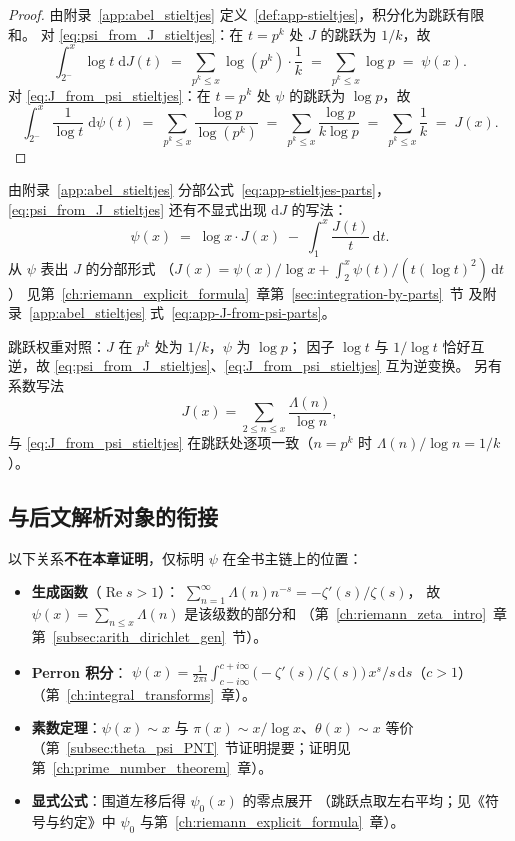 \begin{proof}
由附录~\ref{app:abel_stieltjes} 定义~\ref{def:app-stieltjes}，积分化为跳跃有限和。
对 \eqref{eq:psi_from_J_stieltjes}：在 $t=p^k$ 处 $J$ 的跳跃为 $1/k$，故
\[
\int_{2^-}^{x} \log t \; \mathrm{d}J(t)
  \;=\; \sum_{p^k \le x} \log(p^k) \cdot \frac{1}{k}
  \;=\; \sum_{p^k \le x} \log p
  \;=\; \psi(x).
\]
对 \eqref{eq:J_from_psi_stieltjes}：在 $t=p^k$ 处 $\psi$ 的跳跃为 $\log p$，故
\[
\int_{2^-}^{x} \frac{1}{\log t} \; \mathrm{d}\psi(t)
  \;=\; \sum_{p^k \le x} \frac{\log p}{\log(p^k)}
  \;=\; \sum_{p^k \le x} \frac{\log p}{k\log p}
  \;=\; \sum_{p^k \le x} \frac{1}{k}
  \;=\; J(x).
\]
\end{proof}

由附录~\ref{app:abel_stieltjes} 分部公式~\eqref{eq:app-stieltjes-parts}，
\eqref{eq:psi_from_J_stieltjes} 还有不显式出现 $\mathrm{d}J$ 的写法：
\begin{equation}
\psi(x) \;=\; \log x \cdot J(x) \;-\; \int_1^x \frac{J(t)}{t} \, \mathrm{d}t.
\label{eq:psi_J_parts}
\end{equation}
从 $\psi$ 表出 $J$ 的分部形式
（$J(x)=\psi(x)/\log x+\int_2^x\psi(t)/(t(\log t)^2)\,\mathrm{d}t$）
见第~\ref{ch:riemann_explicit_formula}~章第~\ref{sec:integration-by-parts}~节
及附录~\ref{app:abel_stieltjes} 式~\eqref{eq:app-J-from-psi-parts}。

跳跃权重对照：$J$ 在 $p^k$ 处为 $1/k$，$\psi$ 为 $\log p$；
因子 $\log t$ 与 $1/\log t$ 恰好互逆，故 \eqref{eq:psi_from_J_stieltjes}、\eqref{eq:J_from_psi_stieltjes} 互为逆变换。
另有系数写法
\[
J(x)=\sum_{2\le n\le x}\frac{\Lambda(n)}{\log n},
\]
与 \eqref{eq:J_from_psi_stieltjes} 在跳跃处逐项一致（$n=p^k$ 时 $\Lambda(n)/\log n=1/k$）。

\subsection{与后文解析对象的衔接}

以下关系\textbf{不在本章证明}，仅标明 $\psi$ 在全书主链上的位置：

\begin{itemize}
  \item \textbf{生成函数}（$\operatorname{Re}s>1$）：
    $\sum_{n=1}^{\infty}\Lambda(n)n^{-s}=-\zeta'(s)/\zeta(s)$，
    故 $\psi(x)=\sum_{n\le x}\Lambda(n)$ 是该级数的部分和
    （第~\ref{ch:riemann_zeta_intro}~章第~\ref{subsec:arith_dirichlet_gen}~节）。
  \item \textbf{Perron 积分}：
    $\psi(x)=\frac{1}{2\pi i}\int_{c-i\infty}^{c+i\infty}
    \bigl(-\zeta'(s)/\zeta(s)\bigr)\,x^s/s\,\mathrm{d}s$（$c>1$）
    （第~\ref{ch:integral_transforms}~章）。
  \item \textbf{素数定理}：$\psi(x)\sim x$ 与 $\pi(x)\sim x/\log x$、$\theta(x)\sim x$ 等价
    （第~\ref{subsec:theta_psi_PNT}~节证明提要；证明见第~\ref{ch:prime_number_theorem}~章）。
  \item \textbf{显式公式}：围道左移后得 $\psi_0(x)$ 的零点展开
    （跳跃点取左右平均；见《符号与约定》中 $\psi_0$ 与第~\ref{ch:riemann_explicit_formula}~章）。
\end{itemize}

